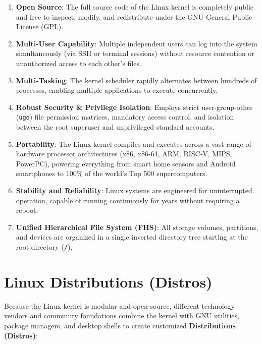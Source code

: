 \begin{enumerate}[leftmargin=1.5em]
    \item \textbf{Open Source}: The full source code of the Linux kernel is completely public and free to inspect, modify, and redistribute under the GNU General Public License (GPL).
    \item \textbf{Multi-User Capability}: Multiple independent users can log into the system simultaneously (via SSH or terminal sessions) without resource contention or unauthorized access to each other's files.
    \item \textbf{Multi-Tasking}: The kernel scheduler rapidly alternates between hundreds of processes, enabling multiple applications to execute concurrently.
    \item \textbf{Robust Security \& Privilege Isolation}: Employs strict user-group-other (\texttt{ugo}) file permission matrices, mandatory access control, and isolation between the root superuser and unprivileged standard accounts.
    \item \textbf{Portability}: The Linux kernel compiles and executes across a vast range of hardware processor architectures (x86, x86-64, ARM, RISC-V, MIPS, PowerPC), powering everything from smart home sensors and Android smartphones to 100\% of the world's Top 500 supercomputers.
    \item \textbf{Stability and Reliability}: Linux systems are engineered for uninterrupted operation, capable of running continuously for years without requiring a reboot.
    \item \textbf{Unified Hierarchical File System (FHS)}: All storage volumes, partitions, and devices are organized in a single inverted directory tree starting at the root directory (\texttt{/}).
\end{enumerate}

\section{Linux Distributions (Distros)}

Because the Linux kernel is modular and open-source, different technology vendors and community foundations combine the kernel with GNU utilities, package managers, and desktop shells to create customized \textbf{Distributions (Distros)}:

